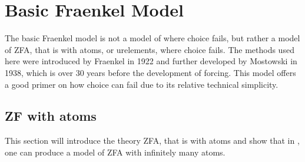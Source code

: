 \chapter{Basic Fraenkel Model}
\label{chapter:fraenkelmostowski}

The basic Fraenkel model is not a model of \ZF where choice fails, but rather a model of \textsf{ZFA}, that is \ZF with atoms, or urelements, where choice fails.
The methods used here were introduced by Fraenkel in 1922 and further developed by Mostowski in 1938,
which is over 30 years before the development of forcing.
This model offers a good primer on how choice can fail due to its relative technical simplicity.

\section{ZF with atoms}

This section will introduce the theory \textsf{ZFA}, that is \ZF with atoms and
show that in \ZFC, one can produce a model of \textsf{ZFA} with infinitely many atoms.


